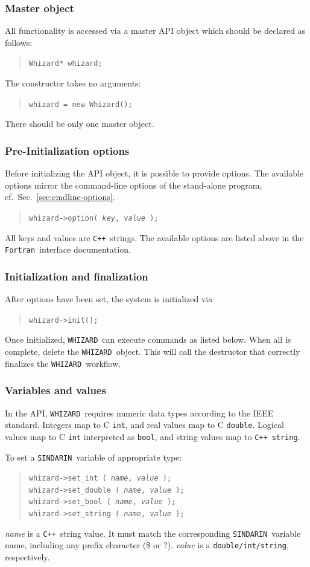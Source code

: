 \documentclass[12pt]{book}
\newcommand{\ttt}[1]{\texttt{#1}}
\newcommand{\whizard}{\ttt{WHIZARD}}
\newcommand{\sindarin}{\ttt{SINDARIN}}
\newcommand{\cpp}{\ttt{C++}}
\newcommand{\fortran}{\ttt{Fortran}}
\begin{document}
\subsubsection{Master object}
All functionality is accessed via a master API object which should be declared
as follows:
\begin{quote}
  \tt Whizard* whizard;
\end{quote}
The constructor takes no arguments:
\begin{quote}
  \tt whizard = new Whizard();
\end{quote}
There should be only one master object.

\subsubsection{Pre-Initialization options}
Before initializing the API object, it is possible to provide options.  The
available options mirror the command-line options of the stand-alone program,
cf.\ Sec.~\ref{sec:cmdline-options}.
\begin{quote}
  \tt  whizard->option( \textit{key}, \textit{value} );
\end{quote}
All keys and values are \cpp\ strings.  The available options are
listed above in the \fortran\ interface documentation.

\subsubsection{Initialization and finalization}
After options have been set, the system is initialized via
\begin{quote}
  \tt whizard->init();
\end{quote}
Once initialized, \whizard\ can execute commands as listed below.  When all
is complete, delete the \whizard\ object.  This will call the destructor that
correctly finalizes the \whizard\ workflow.

\subsubsection{Variables and values}

In the API, \whizard\ requires numeric data types according to the IEEE
standard.  Integers map to C \ttt{int}, and real values map to C
\ttt{double}.  Logical values map to C \ttt{int} interpreted as \ttt{bool},
and string values map to \cpp\ \ttt{string}.

To set a \sindarin\ variable of appropriate type:
\begin{quote}
  \tt whizard->set\_int ( \textit{name}, \textit{value} );
  \\
  \tt whizard->set\_double ( \textit{name}, \textit{value} );
  \\
  \tt whizard->set\_bool ( \textit{name}, \textit{value} );
  \\
  \tt whizard->set\_string ( \textit{name}, \textit{value} );
\end{quote}
\textit{name} is a \cpp\ string value.  It must match the corresponding
\sindarin\ variable name, including any prefix character (\$ or ?).
\textit{value} is a \ttt{double/int/string}, respectively.
\end{document}
